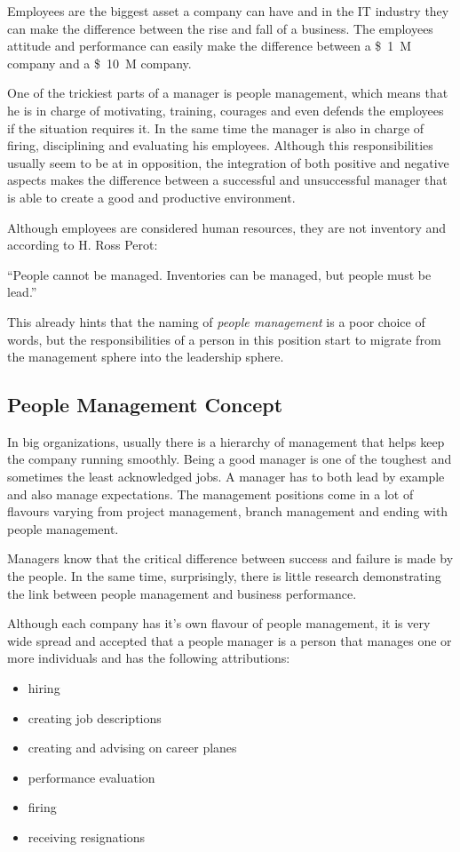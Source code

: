 Employees are the biggest asset a company can have and in the IT industry they can make the difference between the rise and fall of a business. 
The employees attitude and performance can easily make the difference between a \SI{1}[\$]{M} company and a \SI{10}[\$]{M} company.

One of the trickiest parts of a manager is people management, which means that he is in charge of motivating, training, courages and even defends the employees if the situation requires it. In the same time the manager is also in charge of firing, disciplining and evaluating his employees. Although this responsibilities usually seem to be at in opposition, the integration of both positive and negative aspects makes the difference between a successful and unsuccessful manager that is able to create a good and productive environment.

Although employees are considered human resources, they are not inventory and according to H. Ross Perot:
\begin{displayquote}
``People cannot be managed. Inventories can be managed, but people must be lead.''
\end{displayquote}
This already hints that the naming of \textit{people management} is a poor choice of words, but the responsibilities of a person in this position start to migrate from the management sphere into the leadership sphere.

\subsection{People Management Concept}
\label{subsec:pmconcept}

In big organizations, usually there is a hierarchy of management that helps keep the company running smoothly. Being a good manager is one of the toughest and sometimes the least acknowledged jobs. A manager has to both lead by example and also manage expectations. The management positions come in a lot of flavours varying from project management, branch management and ending with people management. 

Managers know that the critical difference between success and failure is made by the people. In the same time, surprisingly, there is little research demonstrating the link between people management and business performance. 

Although each company has it's own flavour of people management, it is very wide spread and accepted that a people manager is a person that manages one or more individuals and has the following attributions:
\begin{itemize}
\item hiring
\item creating job descriptions
\item creating and advising on career planes
\item performance evaluation
\item firing
\item receiving resignations
\end{itemize}

